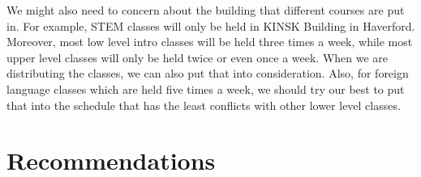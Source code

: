 \documentclass[11pt, oneside]{article}   	%
\begin{document}
We might also need to concern about the building that different courses are put in. For example, STEM classes will only be held in KINSK Building in Haverford. Moreover, most low level intro classes will be held three times a week, while most upper level classes will only be held twice or even once a week. When we are distributing the classes, we can also put that into consideration. Also, for foreign language classes which are held five times a week, we should try our best to put that into the schedule that has the least conflicts with other lower level classes. 

\newpage
\section{Recommendations}
\end{document}
